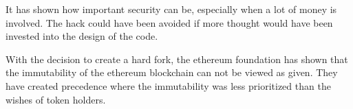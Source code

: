 \documentclass[a4paper, 11pt]{scrartcl}
\begin{document}
It has shown how important security can be, especially when a lot of money is involved. The hack could have been avoided if more thought would have been invested into the design of the code. 

With the decision to create a hard fork, the ethereum foundation has shown that the immutability of the ethereum blockchain can not be viewed as given. They have created precedence where the immutability was less prioritized than the wishes of token holders.

\nocite{*}
\clearpage
\printbibliography[heading=bibintoc]
\end{document}
